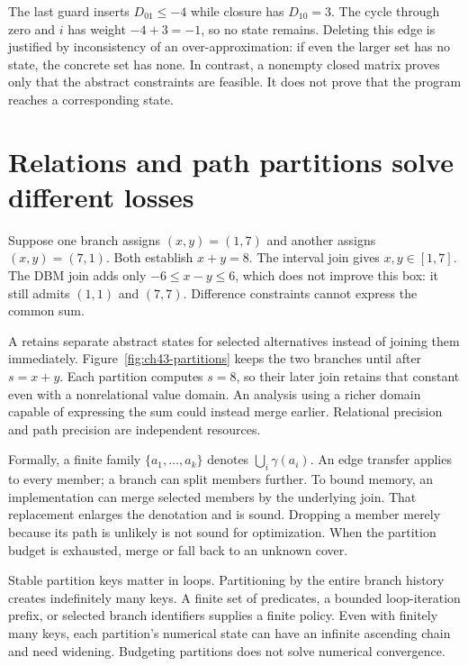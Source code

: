 The last guard inserts $D_{01}\leq-4$ while closure has $D_{10}=3$.
The cycle through zero and $i$ has weight $-4+3=-1$, so no state remains.
Deleting this edge is justified by inconsistency of an over-approximation: if even the larger set has no state, the concrete set has none.
In contrast, a nonempty closed matrix proves only that the abstract constraints are feasible.
It does not prove that the program reaches a corresponding state.

\section{Relations and path partitions solve different losses}
\label{sec:ch43-paths}

Suppose one branch assigns $(x,y)=(1,7)$ and another assigns $(x,y)=(7,1)$.
Both establish $x+y=8$.
The interval join gives $x,y\in[1,7]$.
The DBM join adds only $-6\leq x-y\leq6$, which does not improve this box: it still admits $(1,1)$ and $(7,7)$.
Difference constraints cannot express the common sum.

A  retains separate abstract states for selected alternatives instead of joining them immediately.
Figure~\ref{fig:ch43-partitions} keeps the two branches until after $s=x+y$.
Each partition computes $s=8$, so their later join retains that constant even with a nonrelational value domain.
An analysis using a richer domain capable of expressing the sum could instead merge earlier.
Relational precision and path precision are independent resources.



Formally, a finite family $\{a_1,\ldots,a_k\}$ denotes $\bigcup_i\gamma(a_i)$.
An edge transfer applies to every member; a branch can split members further.
To bound memory, an implementation can merge selected members by the underlying join.
That replacement enlarges the denotation and is sound.
Dropping a member merely because its path is unlikely is not sound for optimization.
When the partition budget is exhausted, merge or fall back to an unknown cover.

Stable partition keys matter in loops.
Partitioning by the entire branch history creates indefinitely many keys.
A finite set of predicates, a bounded loop-iteration prefix, or selected branch identifiers supplies a finite policy.
Even with finitely many keys, each partition's numerical state can have an infinite ascending chain and need widening.
Budgeting partitions does not solve numerical convergence.

